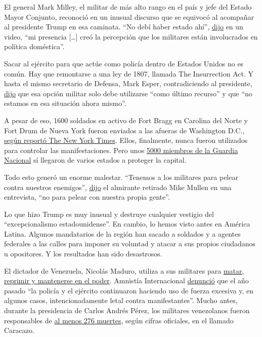 El general Mark Milley, el militar de más alto rango en el país y jefe
del Estado Mayor Conjunto, reconoció en un inusual discurso que se
equivocó al acompañar al presidente Trump en esa caminata. ``No debí
haber estado ahí'',
\href{https://www.nytimes3xbfgragh.onion/2020/06/11/us/politics/trump-milley-military-protests-lafayette-square.html}{dijo}
en un video, ``mi presencia {[}\ldots{}{]} creó la percepción que los
militares están involucrados en política doméstica''.

Sacar al ejército para que actúe como policía dentro de Estados Unidos
no es común. Hay que remontarse a una ley de 1807, llamada The
Insurrection Act. Y hasta el mismo secretario de Defensa, Mark Esper,
contradiciendo al presidente,
\href{https://www.nytimes3xbfgragh.onion/video/us/politics/100000007172076/esper-trump-protests-troops.html?playlistId=video/latest-video}{dijo}
que esa opción militar solo debe utilizarse ``como último recurso'' y
que ``no estamos en esa situación ahora mismo''.

A pesar de eso, 1600 soldados en activo de Fort Bragg en Carolina del
Norte y Fort Drum de Nueva York fueron enviados a las afueras de
Washington D.C.,
\href{https://www.nytimes3xbfgragh.onion/2020/06/04/us/politics/trump-troops-washington-pentagon.html}{según
reportó The New York Times}. Ellos, finalmente, nunca fueron utilizados
para controlar las manifestaciones. Pero unos
\href{https://www.nytimes3xbfgragh.onion/2020/06/07/us/politics/trump-military-troops-protests.html}{5000
miembros de la Guardia Nacional} sí llegaron de varios estados a
proteger la capital.

Todo esto generó un enorme malestar. ``Tenemos a los militares para
pelear contra nuestros enemigos'',
\href{https://www.nytimes3xbfgragh.onion/2020/06/07/us/politics/trump-military-troops-protests.html}{dijo}
el almirante retirado Mike Mullen en una entrevista, ``no para pelear
con nuestra propia gente''.

Lo que hizo Trump es muy inusual y destruye cualquier vestigio del
``excepcionalismo estadounidense''. En cambio, lo hemos visto antes en
América Latina. Algunos mandatarios de la región han sacado a soldados y
a agentes federales a las calles para imponer su voluntad y atacar a sus
propios ciudadanos u opositores. Y los resultados han sido desastrosos.

El dictador de Venezuela, Nicolás Maduro, utiliza a sus militares para
\href{https://www.nytimes3xbfgragh.onion/es/2019/07/05/espanol/america-latina/venezuela-faes-derechos-humanos.html}{matar,
reprimir y mantenerse en el poder}. Amnistía Internacional
\href{https://www.amnesty.org/es/countries/americas/venezuela/report-venezuela/}{denunció}
que el año pasado ``la policía y el ejército continuaron haciendo uso de
fuerza excesiva y, en algunos casos, intencionadamente letal contra
manifestantes''. Mucho antes, durante la presidencia de Carlos Andrés
Pérez, los militares venezolanos fueron responsables de
\href{https://www.bbc.com/mundo/noticias-america-latina-47379668}{al
menos 276 muertes}, según cifras oficiales, en el llamado Caracazo.

